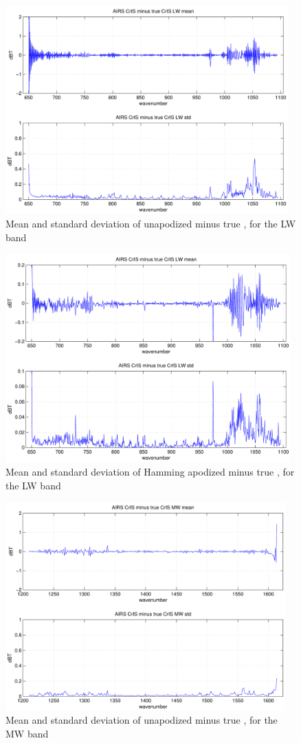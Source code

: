 \documentclass[12pt]{article}
\begin{document}
\begin{figure}
  \centering
  \includegraphics[height=8cm]{figures/airs_cris_diff_LW_noap.pdf}
  \caption{Mean and standard deviation of unapodized {\airs} {\cris}
    minus true {\cris}, for the {\cris} LW band }
  \label{aclwd}
\end{figure}

\begin{figure}
  \centering
  \includegraphics[height=8cm]{figures/airs_cris_diff_LW_hamm.pdf}
  \caption{Mean and standard deviation of Hamming apodized {\airs}
      {\cris} minus true {\cris}, for the {\cris} LW band }
  \label{aclwdh}
\end{figure}

\begin{figure}
  \centering
  \includegraphics[height=8cm]{figures/airs_cris_diff_MW_noap.pdf}
  \caption{Mean and standard deviation of unapodized {\airs} {\cris}
    minus true {\cris}, for the {\cris} MW band }
  \label{acmwd}
\end{figure}
\end{document}
